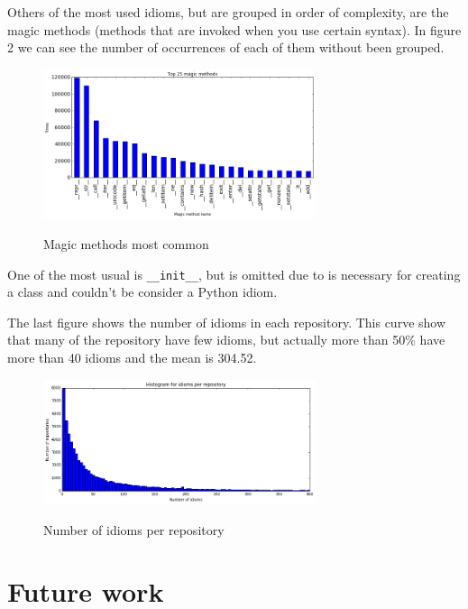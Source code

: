 \documentclass[conference]{IEEEtran}
\begin{document}
Others of the most used idioms, but are grouped in order of complexity, are the magic methods (methods that are invoked when you use certain syntax). In figure 2 we can see the number of occurrences of each of them without been grouped. 

\begin{figure}[ht]
\centering
\includegraphics[width=80mm]{img/magic_methods.png}
\label{fig:magic_ranking}
\caption{Magic methods most common}
\end{figure}

One of the most usual is \verb|__init__|, but is omitted due to is necessary for creating a class and couldn't be consider a Python idiom.

The last figure shows the number of idioms in each repository. This curve show that many of the repository have few idioms, but actually more than 50\% have more than 40 idioms and the mean is 304.52.

\begin{figure}[ht]
\centering  
\includegraphics[width=80mm]{img/idioms_per_repository.png}
\label{fig:idioms_per_repository}
\caption{Number of idioms per repository}
\end{figure}


\section{Future work}



\end{document}
